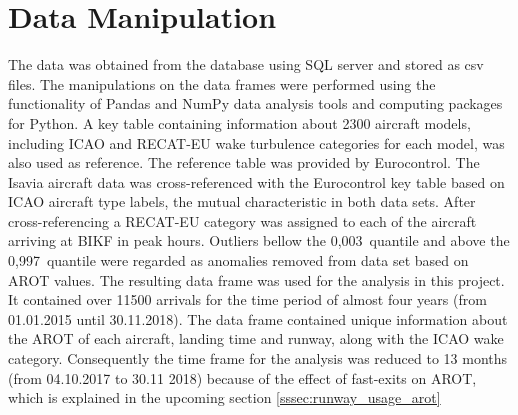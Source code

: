 \section{Data Manipulation}
The data was obtained from the database using SQL server and stored as csv files. The manipulations on the data frames were performed using the functionality of Pandas and NumPy data analysis tools and computing packages for Python. A key table containing information about 2300 aircraft models, including ICAO and RECAT-EU wake turbulence categories for each model, was also used as reference. 
The reference table was provided by Eurocontrol. 
The Isavia aircraft data was cross-referenced with the Eurocontrol key table based on ICAO aircraft type labels, the mutual characteristic in both data sets. 
After cross-referencing a RECAT-EU category was assigned to each of the aircraft arriving at BIKF in peak hours. Outliers bellow the 0,003~quantile and above the 0,997~quantile were regarded as anomalies removed from data set based on AROT values. 
The resulting data frame was used for the analysis in this project. 
It contained over 11500 arrivals for the time period of almost four years (from 01.01.2015 until 30.11.2018). The data frame contained unique information about the AROT of each aircraft, landing time and runway, along with the ICAO wake category. Consequently the time frame for the analysis was reduced to 13 months (from 04.10.2017 to 30.11 2018) because of the effect of fast-exits on AROT, which is explained in the upcoming section \ref{sssec:runway_usage_arot}


